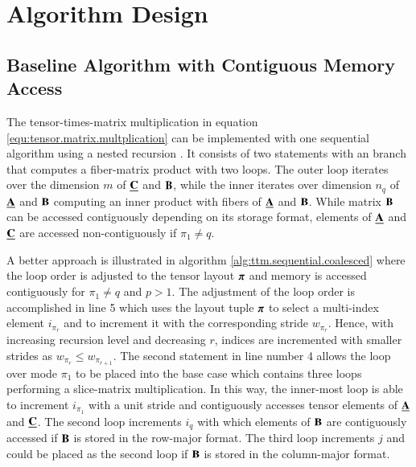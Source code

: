 \section{Algorithm Design}
\label{sec:design}
\subsection{Baseline Algorithm with Contiguous Memory Access}
\label{sec:design:modified.baseline.algorithm}
The tensor-times-matrix multiplication in equation \ref{equ:tensor.matrix.multplication} can be implemented with one sequential algorithm using a nested recursion \cite{bassoy:2018:fast}.
It consists of two  statements with an  branch that computes a fiber-matrix product with two loops.
The outer loop iterates over the dimension $m$ of $\underline{\mathbf{C}}$ and $\mathbf{B}$, while the inner iterates over dimension $n_q$ of $\underline{\mathbf{A}}$ and $\mathbf{B}$ computing an inner product with fibers of $\underline{\mathbf{A}}$ and $\mathbf{B}$. 
While matrix $\mathbf{B}$ can be accessed contiguously depending on its storage format, elements of $\underline{\mathbf{A}}$ and $\underline{\mathbf{C}}$ are accessed non-contiguously if $\pi_1 \neq q$.



A better approach is illustrated in algorithm \ref{alg:ttm.sequential.coalesced} where the loop order is adjusted to the tensor layout $\boldsymbol{\pi}$ and memory is accessed contiguously for $\pi_1 \neq q$ and $p > 1$.
The adjustment of the loop order is accomplished in line 5 which uses the layout tuple $\boldsymbol{\pi}$ to select a multi-index element $i_{\pi_r}$ and to increment it with the corresponding stride $w_{\pi_r}$.
Hence, with increasing recursion level and decreasing $r$, indices are incremented with smaller strides as $w_{\pi_r} \leq w_{\pi_{r+1}}$.
The second  statement in line number 4 allows the loop over mode $\pi_1$ to be placed into the base case which contains three loops performing a slice-matrix multiplication.
In this way, the inner-most loop is able to increment $i_{\pi_1}$ with a unit stride and contiguously accesses tensor elements of $\underline{\mathbf{A}}$ and $\underline{\mathbf{C}}$.
The second loop increments $i_q$ with which elements of $\mathbf{B}$ are contiguously accessed if $\mathbf{B}$ is stored in the row-major format.
The third loop increments $j$ and could be placed as the second loop if $\mathbf{B}$ is stored in the column-major format.

